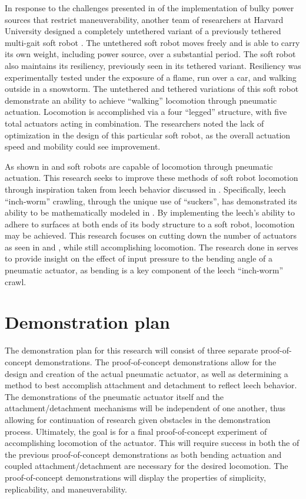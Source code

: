\documentclass{IEEEtran}
\begin{document}
In response to the challenges presented in \cite{rus2015design} of the implementation of bulky power sources that restrict maneuverability, another team of researchers at Harvard University designed a completely untethered variant of a previously tethered multi-gait soft robot \cite{shepherd2011multigait} \cite{tolley2014resilient} .  The untethered soft robot moves freely and is able to carry its own weight, including power source, over a substantial period.  The soft robot also maintains its resiliency, previously seen in its tethered variant.  Resiliency was experimentally tested under the exposure of a flame, run over a car, and walking outside in a snowstorm.  The untethered and tethered variations of this soft robot demonstrate an ability to achieve ``walking'' locomotion through pneumatic actuation.  Locomotion is accomplished via a four ``legged'' structure, with five total actuators acting in combination.  The researchers noted the lack of optimization in the design of this particular soft robot, as the overall actuation speed and mobility could see improvement. 

As shown in \cite{shepherd2011multigait} and \cite{tolley2014resilient}  soft robots are capable of locomotion through pneumatic actuation.  This research seeks to improve these methods of soft robot locomotion through inspiration taken from leech behavior discussed in \cite{kristan2005neuronal}.  Specifically, leech ``inch-worm'' crawling, through the unique use of ``suckers'', has demonstrated its ability to be mathematically modeled in \cite{alscher1998simulating}.  By implementing the leech’s ability to adhere to surfaces at both ends of its body structure to a soft robot, locomotion may be achieved.  This research focuses on cutting down the number of actuators as seen in \cite{shepherd2011multigait} and \cite{tolley2014resilient}, while still accomplishing locomotion.  The research done in \cite{polygerinos2015modeling} serves to provide insight on the effect of input pressure to the bending angle of a pneumatic actuator, as bending is a key component of the leech ``inch-worm'' crawl.




\section{Demonstration plan}
The demonstration plan for this research will consist of three separate proof-of-concept demonstrations.  The proof-of-concept demonstrations allow for the design and creation of the actual pneumatic actuator, as well as determining a method to best accomplish attachment and detachment to reflect leech behavior.  The demonstrations of the pneumatic actuator itself and the attachment/detachment mechanisms will be independent of one another, thus allowing for continuation of research given obstacles in the demonstration process.  Ultimately, the goal is for a final proof-of-concept experiment of accomplishing locomotion of the actuator.  This will require success in both the of the previous proof-of-concept demonstrations as both bending actuation and coupled attachment/detachment are necessary for the desired locomotion.  The proof-of-concept demonstrations will display the properties of simplicity, replicability, and maneuverability.
\end{document}
